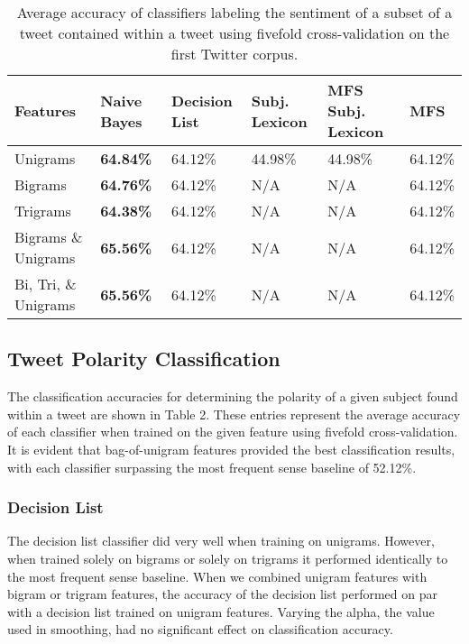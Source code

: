 \documentclass[11pt]{article}
\begin{document}
\begin{table*}[htbp!]
  \centering
  \begin{tabular}{| l || l | l | l | l| l |}
  \hline
  Features & Naive Bayes & Decision List & Subj. Lexicon & MFS Subj. Lexicon & MFS \\ 
  \hline \hline
  Unigrams              & \bf{64.84}\%      & 64.12\% & 44.98\% & 44.98\%
                        & 64.12\% \\  \hline
  Bigrams               & \bf{64.76}\%      & 64.12\%      & N/A      
                        & N/A          & 64.12\% \\  \hline
  Trigrams              & \bf{64.38}\%      & 64.12\%      & N/A          
                        & N/A          & 64.12\% \\  \hline
  Bigrams \& Unigrams   & \bf{65.56\%} & 64.12\%      & N/A          & N/A          & 64.12\% \\  \hline
  Bi, Tri, \& Unigrams  & \bf{65.56\%} & 64.12\%      & N/A          & N/A          & 64.12\% \\  \hline  
  \end{tabular}
  \caption{Average accuracy of classifiers labeling the sentiment of a subset of a tweet contained within a tweet using fivefold cross-validation on the first Twitter corpus.}
\end{table*}

\subsection{Tweet Polarity Classification}
The classification accuracies for determining the polarity of a given subject found within a tweet are shown in Table 2. These entries represent the average accuracy of each classifier when trained on the given feature using fivefold cross-validation. It is evident that bag-of-unigram features provided the best classification results, with each classifier surpassing the most frequent sense baseline of 52.12\%.

\subsubsection*{Decision List}
The decision list classifier did very well when training on unigrams. However, when trained solely on bigrams or solely on trigrams it performed identically to the most frequent sense baseline. When we combined unigram features with bigram or trigram features, the accuracy of the decision list performed on par with a decision list trained on unigram features. Varying the alpha, the value used in smoothing, had no significant effect on classification accuracy. 
\end{document}
